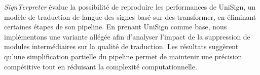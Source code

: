 \textit{SignTerpreter} 
évalue la possibilité de reproduire les performances de UniSign, un modèle de traduction de langue des signes basé sur des transformer, 
en éliminant certaines étapes de son pipeline.
En prenant UniSign comme base, nous implémentons une variante allégée afin d’analyser l’impact de la suppression 
de modules intermédiaires sur la qualité de traduction. Les résultats suggèrent qu'une simplification partielle 
du pipeline permet de maintenir une précision compétitive tout en réduisant la complexité computationnelle.